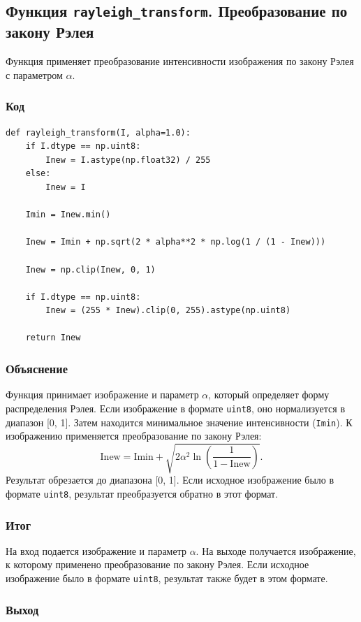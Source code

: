 \documentclass[a4paper,12pt]{article}
\begin{document}
\subsection{Функция \texttt{rayleigh\_transform}. Преобразование по закону Рэлея}

Функция применяет преобразование интенсивности изображения по закону Рэлея с параметром \( \alpha \).

\subsubsection{Код}
\begin{verbatim}
def rayleigh_transform(I, alpha=1.0):
    if I.dtype == np.uint8:
        Inew = I.astype(np.float32) / 255
    else:
        Inew = I

    Imin = Inew.min()

    Inew = Imin + np.sqrt(2 * alpha**2 * np.log(1 / (1 - Inew)))

    Inew = np.clip(Inew, 0, 1)

    if I.dtype == np.uint8:
        Inew = (255 * Inew).clip(0, 255).astype(np.uint8)
    
    return Inew
\end{verbatim}

\subsubsection{Объяснение}
Функция принимает изображение и параметр \( \alpha \), который определяет форму распределения Рэлея. Если изображение в формате \texttt{uint8}, оно нормализуется в диапазон [0, 1]. Затем находится минимальное значение интенсивности (\texttt{Imin}). К изображению применяется преобразование по закону Рэлея:
\[
\text{Inew} = \text{Imin} + \sqrt{2 \alpha^2 \ln\left(\frac{1}{1 - \text{Inew}}\right)}.
\]
Результат обрезается до диапазона [0, 1]. Если исходное изображение было в формате \texttt{uint8}, результат преобразуется обратно в этот формат.

\subsubsection{Итог}
На вход подается изображение и параметр \( \alpha \). На выходе получается изображение, к которому применено преобразование по закону Рэлея. Если исходное изображение было в формате \texttt{uint8}, результат также будет в этом формате.

\subsubsection{Выход}
\end{document}
